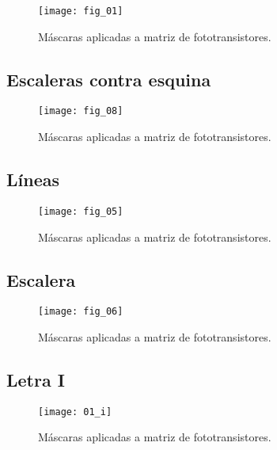             \begin{figure}[hbtp]
                \centering
                \texttt{[image: fig\_01]}
                \caption{Máscaras aplicadas a matriz de fototransistores.}
                \label{fig:fig_01}
            \end{figure} 
\newpage
\subsection{Escaleras contra esquina}

            \begin{figure}[hbtp]
                \centering
                \texttt{[image: fig\_08]}
                \caption{Máscaras aplicadas a matriz de fototransistores.}
                \label{fig:fig_08}
            \end{figure} 
\newpage
\subsection{Líneas}

            \begin{figure}[hbtp]
                \centering
                \texttt{[image: fig\_05]}
                \caption{Máscaras aplicadas a matriz de fototransistores.}
                \label{fig:fig_05}
            \end{figure} 
\newpage
\subsection{Escalera}

            \begin{figure}[hbtp]
                \centering
                \texttt{[image: fig\_06]}
                \caption{Máscaras aplicadas a matriz de fototransistores.}
                \label{fig:fig_06}
            \end{figure} 
\newpage
\subsection{Letra I}

            \begin{figure}[hbtp]
                \centering
                \texttt{[image: 01\_i]}
                \caption{Máscaras aplicadas a matriz de fototransistores.}
                \label{fig:01_i}
            \end{figure} 
\newpage
